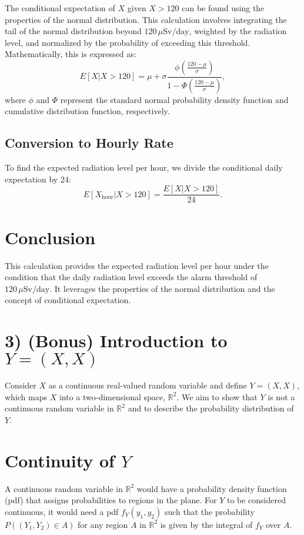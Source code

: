 \documentclass{article}
\begin{document}
The conditional expectation of $X$ given $X > 120$ can be found using the properties of the normal distribution. This calculation involves integrating the tail of the normal distribution beyond $120\, \mu\text{Sv}/\text{day}$, weighted by the radiation level, and normalized by the probability of exceeding this threshold. Mathematically, this is expressed as:
\[ E[X | X > 120] = \mu + \sigma \frac{\phi\left(\frac{120 - \mu}{\sigma}\right)}{1 - \Phi\left(\frac{120 - \mu}{\sigma}\right)}, \]
where $\phi$ and $\Phi$ represent the standard normal probability density function and cumulative distribution function, respectively.

\subsection*{Conversion to Hourly Rate}

To find the expected radiation level per hour, we divide the conditional daily expectation by 24:
\[ E[X_{\text{hour}} | X > 120] = \frac{E[X | X > 120]}{24}. \]

\section*{Conclusion}

This calculation provides the expected radiation level per hour under the condition that the daily radiation level exceeds the alarm threshold of $120\, \mu\text{Sv}/\text{day}$. It leverages the properties of the normal distribution and the concept of conditional expectation.

\section*{3) (Bonus) Introduction to \(Y = (X, X)\)}

Consider $X$ as a continuous real-valued random variable and define $Y = (X, X)$, which maps $X$ into a two-dimensional space, $\mathbb{R}^2$. We aim to show that $Y$ is not a continuous random variable in $\mathbb{R}^2$ and to describe the probability distribution of $Y$.

\section*{Continuity of \(Y\)}

A continuous random variable in $\mathbb{R}^2$ would have a probability density function (pdf) that assigns probabilities to regions in the plane. For $Y$ to be considered continuous, it would need a pdf $f_Y(y_1, y_2)$ such that the probability $P((Y_1, Y_2) \in A)$ for any region $A$ in $\mathbb{R}^2$ is given by the integral of $f_Y$ over $A$.
\end{document}
